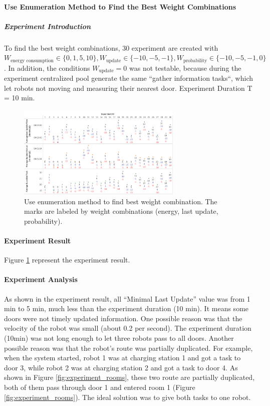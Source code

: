\paragraph{Use Enumeration Method to Find the Best Weight Combinations}
\label{sec:gather_info_experiment_enumerate}
\subparagraph{Experiment Introduction} 
To find the best weight combinations, 30 experiment are created with $W_{\mbox{energy consumption}} \in \{ 0,1,5,10 \}, W_{\mbox{update}} \in \{-10,-5,-1\}, W_{\mbox{probability}} \in \{-10,-5,-1,0\}$. In addition, the conditions $W_{\mbox{update}}=0$ was not testable, because during the experiment centralized pool generate the same ``gather information tasks``, which let robots not moving and measuring their nearest door. Experiment Duration T = 10 min.

\begin{figure}
   \centering
   \includegraphics[width = 0.7\textwidth]{content/images/ch5/gather_info_enumerate.png}
   \caption{Use enumeration method to find best weight combination. The marks are labeled by weight combinations (energy, last update, probability).}
   \label{fig:gather_info_experiment_enumerate}
  \end{figure}
  
\paragraph{Experiment Result} 
Figure \ref{fig:gather_info_experiment_enumerate} represent the experiment result.

\paragraph{Experiment Analysis} 

As shown in the experiment result, all ``Minimal Last Update'' value was from 1 min to 5 min, much less than the experiment duration (10 min). It means some doors were not timely updated information. One possible reason was that the velocity of the robot was small (about 0.2 per second). The experiment duration (10min) was not long enough to let three robots pass to all doors. Another possible reason was that the robot's route was partially duplicated. For example, when the system started, robot 1 was at charging station 1 and got a task to door 3, while robot 2 was at charging station 2 and got a task to door 4. As shown in Figure \ref{fig:experiment_rooms}, these two route are partially duplicated, both of them pass through door 1 and entered room 1 (Figure \ref{fig:experiment_rooms}). The ideal solution was to give both tasks to one robot. 





